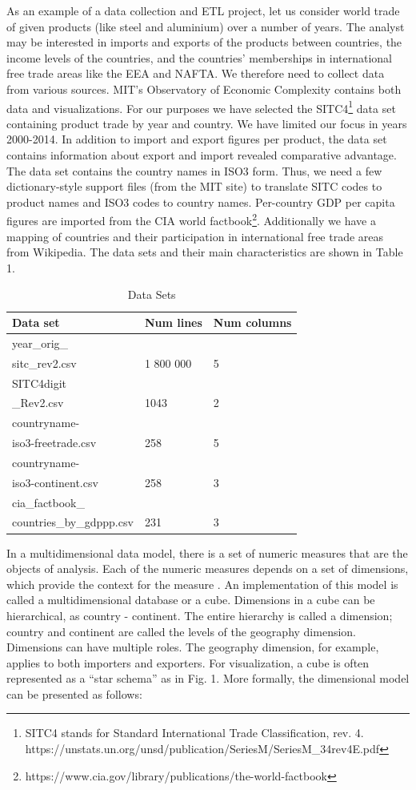\documentclass[USenglish,twocolumn]{article}
\begin{document}
As an example of a data collection and ETL project, let us consider
world trade of given products (like steel and aluminium) over a number
of years. The analyst may be interested in imports and exports of the
products between countries, the income levels of the countries, and the
countries' memberships in international free trade areas like the EEA
and NAFTA. We therefore need to collect data from various sources. MIT's
Observatory of Economic Complexity \cite{Sim12} contains both data and
visualizations. For our purposes we have selected the SITC4\footnote{SITC4
  stands for Standard International Trade Classification, rev. 4.
  https://unstats.un.org/unsd/publication/SeriesM/SeriesM\_34rev4E.pdf}
data set containing product trade by year and country. We have limited
our focus in years 2000-2014. In addition to import and export figures
per product, the data set contains information about export and import
revealed comparative advantage. The data set contains the country names
in ISO3 form. Thus, we need a few dictionary-style support files (from
the MIT site) to translate SITC codes to product names and ISO3 codes to
country names. Per-country GDP per capita figures are imported from the
CIA world factbook\footnote{https://www.cia.gov/library/publications/the-world-factbook}.
Additionally we have a mapping of countries and their participation in
international free trade areas from Wikipedia. The data sets and their
main characteristics are shown in Table 1.


\begin{table}
\begin{tabular}[]{@{}lll@{}}

Data set & Num lines & Num columns\tabularnewline
\midrule

year\_orig\_ & & \tabularnewline
sitc\_rev2.csv & 1 800 000 & 5\tabularnewline
SITC4digit & & \tabularnewline
\_Rev2.csv & 1043 & 2\tabularnewline
countryname- & & \tabularnewline
iso3-freetrade.csv & 258 & 5\tabularnewline
countryname- & & \tabularnewline
iso3-continent.csv & 258 & 3\tabularnewline
cia\_factbook\_ & & \tabularnewline
countries\_by\_gdppp.csv & 231 & 3\tabularnewline

\end{tabular}
\caption{\label{table1}Data Sets}
\end{table}

In a multidimensional data model, there is a set of numeric measures
that are the objects of analysis. Each of the numeric measures depends
on a set of dimensions, which provide the context for the measure \cite{Sur11}. An
implementation of this model is called a multidimensional database or a
cube. Dimensions in a cube can be hierarchical, as country - continent.
The entire hierarchy is called a dimension; country and continent are
called the levels of the geography dimension. Dimensions can have
multiple roles. The geography dimension, for example, applies to both
importers and exporters. For visualization, a cube is often represented
as a ``star schema'' as in Fig. 1. More formally, the dimensional model
can be presented as follows:
\end{document}
